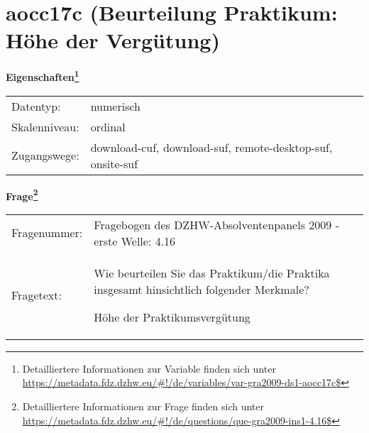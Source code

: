 
    \setcounter{footnote}{0}

    \vspace*{-1.8cm}
	\section{aocc17c (Beurteilung Praktikum: Höhe der Vergütung)}
	\label{section:aocc17c}



    \vspace*{0.5cm}
    \noindent\textbf{Eigenschaften\footnote{Detailliertere Informationen zur Variable finden sich unter
		\url{https://metadata.fdz.dzhw.eu/\#!/de/variables/var-gra2009-ds1-aocc17c$}}}\\
	\begin{tabularx}{\hsize}{@{}lX}
	Datentyp: & numerisch \\
	Skalenniveau: & ordinal \\
	Zugangswege: &
	  download-cuf, 
	  download-suf, 
	  remote-desktop-suf, 
	  onsite-suf
 \\
    \end{tabularx}



				\vspace*{0.5cm}
                \noindent\textbf{Frage\footnote{Detailliertere Informationen zur Frage finden sich unter
		              \url{https://metadata.fdz.dzhw.eu/\#!/de/questions/que-gra2009-ins1-4.16$}}}\\
				\begin{tabularx}{\hsize}{@{}lX}
					Fragenummer: &
					  Fragebogen des DZHW-Absolventenpanels 2009 - erste Welle:
					  4.16
 \\
					Fragetext: & Wie beurteilen Sie das Praktikum/die Praktika insgesamt hinsichtlich folgender Merkmale?\par  Höhe der Praktikumsvergütung \\
				\end{tabularx}





